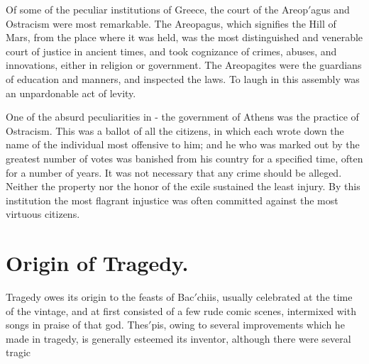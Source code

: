 \documentclass[openany,a4paper]{memoir}
\begin{document}
Of some of the peculiar institutions of Greece, the court 
of the Areop$'$agus and Ostracism were most remarkable. 
The Areopagus, which signifies the Hill of Mars, from the 
place where it was held, was the most distinguished and 
venerable court of justice in ancient times, and took cognizance of crimes, abuses, and innovations, either in religion 
or government. The Areopagites were the guardians of 
education and manners, and inspected the laws. To laugh 
in this assembly was an unpardonable act of levity. 

One of the absurd peculiarities in - the government of 
Athens was the practice of Ostracism. This was a ballot 
of all the citizens, in which each wrote down the name of 
the individual most offensive to him; and he who was 
marked out by the greatest number of votes was banished 
from his country for a specified time, often for a number of 
years. It was not necessary that any crime should be alleged. Neither the property nor the honor of the exile sustained the least injury. By this institution the most flagrant 
injustice was often committed against the most virtuous 
citizens. 

\section{Origin of Tragedy.}

Tragedy owes its origin to the feasts 
of Bac$'$chiis, usually celebrated at the time of the vintage, 
and at first consisted of a few rude comic scenes, intermixed 
with songs in praise of that god. Thes$'$pis, owing to several improvements which he made in tragedy, is generally 
esteemed its inventor, although there were several tragic 
\end{document}
